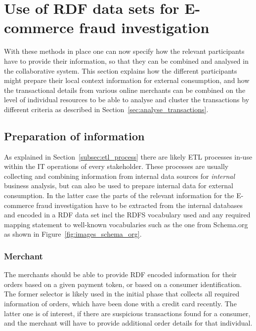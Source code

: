 
\section{Use of \gls{RDF} data sets for \gls{E-commerce} fraud investigation}
\label{sec:working_semantic_data}

With these methods in place one can now specify how the relevant participants have to provide their information, so that they can be combined and analysed in the collaborative system. This section explains how the different participants might prepare their local context information for external consumption, and how the transactional details from various online merchants can be combined on the level of individual resources to be able to analyse and cluster the transactions by different criteria as described in Section~\ref{sec:analyse_transactions}.

\subsection{Preparation of information}
\label{subsec:prepare_information}

As explained in Section~\ref{subsec:etl_process} there are likely \gls{ETL} processes in-use within the \gls{IT} operations of every stakeholder. These processes are usually collecting and combining information from internal data sources for \emph{internal} business analysis, but can also be used to prepare internal data for external consumption. In the latter case the parts of the relevant information for the \gls{E-commerce} fraud investigation have to be extracted from the internal databases and encoded in a \gls{RDF} data set \gls{incl} the \gls{RDFS} vocabulary used and any required mapping statement to well-known vocabularies such as the one from Schema.org as shown in Figure~\ref{fig:images_schema_org}.

\subsubsection{Merchant}
\label{subsub:prep_info_merchant}

The merchants should be able to provide \gls{RDF} encoded information for their orders based on a given payment token, or based on a consumer identification. The former selector is likely used in the initial phase that collects all required information of orders, which have been done with a credit card recently. The latter one is of interest, if there are suspicious transactions found for a consumer, and the merchant will have to provide additional order details for that individual. \\

